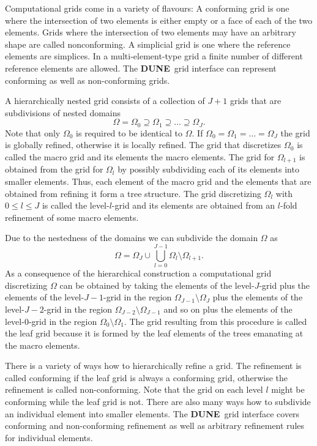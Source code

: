 \documentclass[11pt,a4paper,headinclude,footinclude,DIV14,BCOR8.25mm,titlepage,twoside,openright,normalheadings]{scrreprt}
\newcommand{\Dune}{{\sf\bfseries DUNE}}
\begin{document}
Computational grids come in a variety of flavours: A
{conforming} grid is one where the intersection of two
elements is either empty or a face of each of the two elements. 
Grids where the intersection of two elements may have an
arbitrary shape are called {nonconforming}. A
{simplicial} grid is one where the reference elements are
simplices. In a {multi-element-type} grid a finite number of
different reference elements are allowed. The \Dune\ grid interface
can represent conforming as well as non-conforming grids.

A {hierarchically nested} grid consists of a collection of $J+1$
grids that are subdivisions of nested domains $$\Omega=\Omega_0 \supseteq \Omega_1 \supseteq
\ldots \supseteq \Omega_J.$$ Note that only $\Omega_0$ is required to
be identical to $\Omega$. If $\Omega_0=\Omega_1=\ldots=\Omega_J$ the
grid is {globally refined}, otherwise it is {locally refined}.
The grid that discretizes $\Omega_0$ is called the macro grid and its
elements the macro elements. The
grid for $\Omega_{l+1}$ is obtained from the grid
for $\Omega_l$ by possibly subdividing each of its elements into
smaller elements. Thus, each element of the macro grid and the
elements that are obtained from refining it form a tree structure. The
grid discretizing $\Omega_l$ with $0\leq l \leq J$ is called the level-$l$-grid and its
elements are obtained from an $l$-fold refinement of some macro elements.

Due to the nestedness of the domains we can subdivide the domain
$\Omega$ as $$\Omega = \Omega_J \cup \bigcup_{l=0}^{J-1}
\Omega_l\setminus\Omega_{l+1}.$$ As a consequence of the hierarchical
construction a computational grid discretizing $\Omega$ can be
obtained by taking the elements of the level-$J$-grid plus
the elements of the level-$J-1$-grid in the region
$\Omega_{J-1}\setminus\Omega_{J}$ plus the elements of the level-$J-2$-grid in the region
$\Omega_{J-2}\setminus\Omega_{J-1}$ and so on plus the elements of the level-$0$-grid in the region
$\Omega_{0}\setminus\Omega_{1}$. The grid resulting from this
procedure is called the leaf grid
because it is formed by the leaf elements of the trees emanating at
the macro elements. 

There is a variety of ways how to hierarchically refine a grid. The
refinement is called conforming if the leaf grid is always a
conforming grid, otherwise the refinement is called
non-conforming. Note that the grid on each level $l$ might be
conforming while the leaf grid is not. 
There are also many ways how to subdivide an individual element into smaller elements. The
\Dune\ grid interface covers conforming and non-conforming
refinement as well as arbitrary refinement rules for individual
elements.
\end{document}

